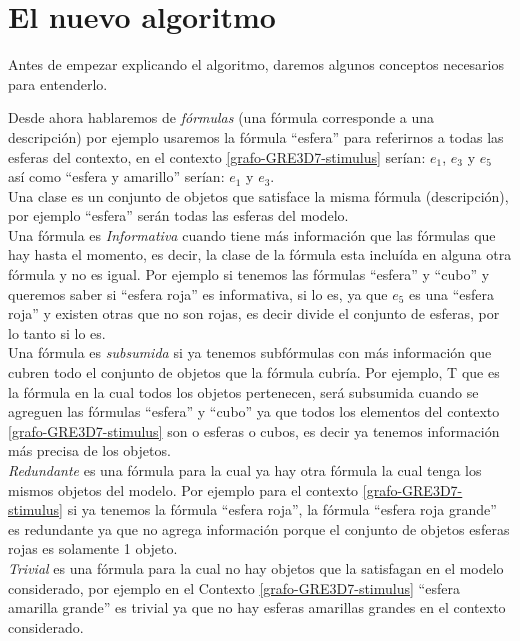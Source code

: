\section{El nuevo algoritmo}

Antes de empezar explicando el algoritmo, daremos algunos conceptos necesarios para entenderlo.

Desde ahora hablaremos de {\it f\'ormulas} (una f\'ormula corresponde a una descripci\'on) por ejemplo usaremos la f\'ormula ``esfera'' para referirnos a todas las esferas del contexto, en el contexto \ref{grafo-GRE3D7-stimulus} ser\'ian: $e_1$, $e_3$ y $e_5$  as\'i como ``esfera y amarillo'' ser\'ian: $e_1$ y $e_3$.\\

Una clase es un conjunto de objetos que satisface la misma f\'ormula (descripci\'on), por ejemplo ``esfera'' ser\'an todas las esferas del modelo.\\

Una f\'ormula es {\it Informativa} cuando tiene m\'as informaci\'on que las f\'ormulas que hay hasta el momento, es decir, la clase de la f\'ormula esta inclu\'ida en alguna otra f\'ormula y no es igual. Por ejemplo si tenemos las f\'ormulas ``esfera'' y ``cubo'' y queremos saber si ``esfera roja'' es informativa, si lo es, ya que $e_5$ es una ``esfera roja'' y existen otras que no son rojas, es decir divide el conjunto de esferas, por lo tanto si lo es. \\

Una f\'ormula es {\it subsumida} si ya tenemos subf\'ormulas con m\'as informaci\'on que cubren todo el conjunto de objetos que la f\'ormula cubr\'ia. Por ejemplo, T que es la f\'ormula en la cual todos los objetos pertenecen, ser\'a subsumida cuando se agreguen las f\'ormulas ``esfera'' y ``cubo'' ya que todos los elementos del contexto \ref{grafo-GRE3D7-stimulus} son o esferas o cubos, es decir ya tenemos informaci\'on m\'as precisa de los objetos.\\

{\it Redundante} es una f\'ormula para la cual ya hay otra f\'ormula la cual tenga los mismos objetos del modelo. Por ejemplo para el contexto \ref{grafo-GRE3D7-stimulus} si ya tenemos la f\'ormula ``esfera roja'', la f\'ormula ``esfera roja grande'' es redundante ya que no agrega informaci\'on porque el conjunto de objetos esferas rojas es solamente 1 objeto.\\

{\it Trivial} es una f\'ormula para la cual no hay objetos que la satisfagan en el modelo considerado, por ejemplo en el Contexto \ref{grafo-GRE3D7-stimulus} ``esfera amarilla grande'' es trivial ya que no hay esferas amarillas grandes en el contexto considerado.\\


